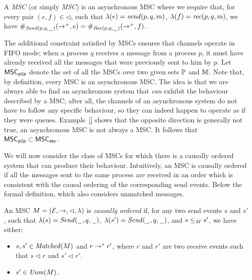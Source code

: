 \begin{definition}
A \emph{\pp MSC} (or simply \emph{MSC}) is an asynchronous MSC where we require that, for every pair $(e,f) \in {\lhd}$, such that $\lambda(e) = \sact{p}{q}{\msg}$, $\lambda(f) = \ract{p}{q}{\msg}$, we have $\sametype{e}{\pqsAct{p}{q}}{\procrel^+} = \sametype{f}{\pqrAct{p}{q}}{\procrel^+}$.
\end{definition}

The additional constraint satisfied by \pp MSCs ensures that channels operate in FIFO mode; when a process $q$ receives a message from a process $p$, it must have already received all the messages that were previously sent to him by $p$. Let $\ppMSCs$ denote the set of all the \pp MSCs over two given sets $\Procs$ and $\Msg$. Note that, by definition, every \pp MSC is an asynchronous MSC. The idea is that we are always able to find an asynchronous system that \emph{can} exhibit the behaviour described by a \pp MSC; after all, the channels of an asynchronous system do not have to follow any specific behaviour, so they can indeed happen to operate as if they were queues. Example~\ref{} shows that the opposite direction is generally not true, an asynchronous MSC is not always a \pp MSC. It follows that $\ppMSCs \subset \asMSCs$.

\medskip

We will now consider the class of MSCs for which there is a causally ordered system that can produce their behaviour. Intuitively, an MSC is causally ordered if all the messages sent to the same process are received in an order which is consistent with the causal ordering of the corresponding send events. Below the formal definition, which also considers unmatched messages.
\begin{definition}
An MSC $\msc = (\Events,\procrel,\lhd,\lambda)$ is \emph{causally ordered} if, for any two send events $s$ and $s'$, such that $\lambda(s)=\pqsAct{\plh}{q}$, $\lambda(s')=\pqsAct{\plh}{q}$, and $s \le_\msc s'$, we have either:
\begin{itemize}\itemsep=0.5ex
	\item $s,s' \in \Matched{\msc}$ and $r \procrel^* r'$, where $r$ and $r'$ are two receive events such that $s \lhd r$ and $s' \lhd r'$.
	\item $s' \in \Unm{\msc}$.
\end{itemize}
\end{definition}

